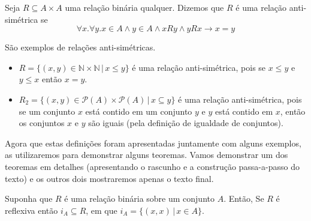 \begin{Definition}
Seja $R\subseteq A \times A$ uma relação binária qualquer. Dizemos que
$R$ é uma relação anti-simétrica se
\[
\forall x.\forall y.  x \in A \land y \in A
\land xRy \land yRx \to x = y
\]
\end{Definition}

\begin{Example}
São exemplos de relações anti-simétricas.
\begin{itemize}
  \item $R = \{(x,y) \in \mathbb{N} \times \mathbb{N}\,|\, x \leq
    y\}$ é uma relação anti-simétrica, pois se $x \leq y$ e $y \leq x$
    então $x = y$.
  \item
    $R_2=\{(x,y)\in\mathcal{P}(A)\times\mathcal{P}(A)\,|\,x\subseteq
    y\}$ é uma relação anti-simétrica, pois se um
    conjunto $x$ está contido em um conjunto $y$ e $y$ está contido em
    $x$, então os conjuntos $x$ e $y$ são iguais (pela definição de
    igualdade de conjuntos).
\end{itemize}
\end{Example}
Agora que estas definições foram apresentadas juntamente com alguns
exemplos, as utilizaremos para demonstrar alguns teoremas. Vamos
demonstrar um dos teoremas em detalhes (apresentando o rascunho e a
construção passa-a-passo do texto) e os outros dois mostraremos apenas
o texto final.
\begin{Theorem}
Suponha que $R$ é uma relação binária sobre um conjunto $A$. Então,
Se $R$ é reflexiva então $i_A \subseteq R$, em que  $i_A=\{(x,x)\,|\,x \in A\}$.
\end{Theorem}
